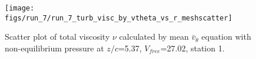 \begin{figure}[H]
\centering
\texttt{[image: figs/run\_7/run\_7\_turb\_visc\_by\_vtheta\_vs\_r\_meshscatter]}
\caption{Scatter plot of total viscosity $\nu$ calculated by mean $\bar{v}_{\theta}$ equation with non-equilibrium pressure at $z/c$=5.37, $V_{free}$=27.02, station 1.}
\label{fig:run_7_turb_visc_by_vtheta_vs_r_meshscatter}
\end{figure}


